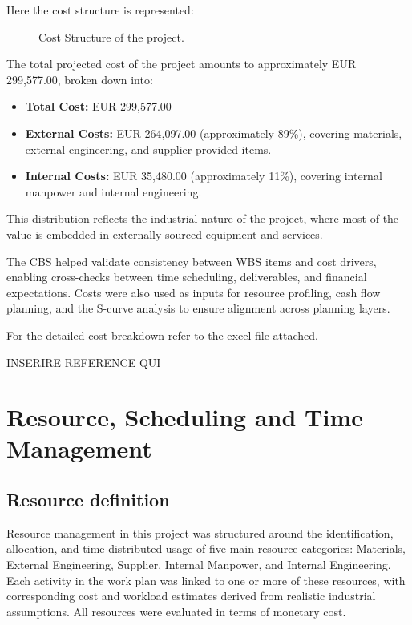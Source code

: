 Here the cost structure is represented:

\begin{figure}[p]
    \centering
    \caption{Cost Structure of the project.}
    \label{fig:CS}
\end{figure}

The total projected cost of the project amounts to approximately EUR 299,577.00, broken down into:
\begin{itemize}
    \item \textbf{Total Cost:} EUR 299,577.00
    \item \textbf{External Costs:} EUR 264,097.00 (approximately 89\%), covering materials, external engineering, and supplier-provided items.
    \item \textbf{Internal Costs:} EUR 35,480.00 (approximately 11\%), covering internal manpower and internal engineering.
\end{itemize}

This distribution reflects the industrial nature of the project, where most of the value is embedded in externally sourced equipment and services.

The CBS helped validate consistency between WBS items and cost drivers, enabling cross-checks between time scheduling, deliverables, and financial expectations. Costs were also used as inputs for resource profiling, cash flow planning, and the S-curve analysis to ensure alignment across planning layers.

For the detailed cost breakdown refer to the excel file attached.

INSERIRE REFERENCE QUI

\section{Resource, Scheduling and Time Management}
\subsection{Resource definition}
Resource management in this project was structured around the identification, allocation, and time-distributed usage of five main resource categories: Materials, External Engineering, Supplier, Internal Manpower, and Internal Engineering. Each activity in the work plan was linked to one or more of these resources, with corresponding cost and workload estimates derived from realistic industrial assumptions. All resources were evaluated in terms of monetary cost.

